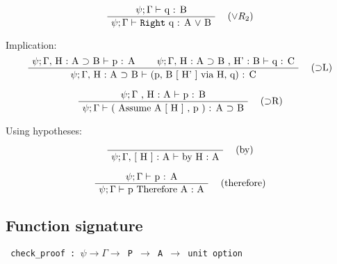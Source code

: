 \documentclass[twoside,a4paper]{article}
\begin{document}
\[
\AxiomC{$\psi ; \Gamma \vdash$ q : B}
\RightLabel{\quad ($\vee R_2$)}
\UnaryInfC{$\psi ; \Gamma \vdash$ {\tt Right} q :  A $\vee$ B}
\DisplayProof
\]

Implication:
\[
\AxiomC{$\psi ; \Gamma ,$ H : A $\supset$ B $\vdash$ p : A}
\AxiomC{$\psi ; \Gamma ,$ H : A $\supset$ B , H' : B $\vdash$ q : C}
\RightLabel{\quad ($\supset$L)}
\BinaryInfC{$\psi ; \Gamma ,$ H : A $\supset$ B $\vdash$
(p, B [ H' ] via H, q) : C}
\DisplayProof
\]

\[
\AxiomC{$\psi ; \Gamma$ , H : A $\vdash$ p : B}
\RightLabel{\quad ($\supset$R)}
\UnaryInfC{$\psi ; \Gamma \vdash$ ( Assume A [ H ] , p ) : A 
$\supset$ B}
\DisplayProof
\]

Using hypotheses:

\[
\AxiomC{}
\RightLabel{\quad (by)}
\UnaryInfC{$\psi ; \Gamma , $ [ H ] : A $\vdash$ by H : A}
\DisplayProof
\]

\[
\AxiomC{$\psi ; \Gamma \vdash$ p : A}
\RightLabel{\quad (therefore)}
\UnaryInfC{$\psi ; \Gamma \vdash$ p Therefore A : A}
\DisplayProof
\]

\subsection{Function signature}
\begin{center}
{\tt
check_proof : $\psi \rightarrow \Gamma \rightarrow $ P 
$\rightarrow$ A $\rightarrow$ unit option
}
\end{center}
\end{document}
